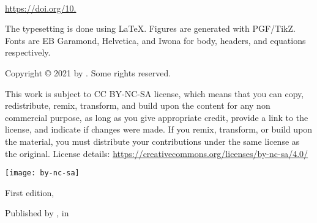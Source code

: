 
{\small\setlength{\parindent}{0em}\setlength{\parskip}{1em}
~

\vfill

\url{https://doi.org/10.}

The typesetting is done using \LaTeX. Figures are generated with PGF/TikZ. Fonts are EB Garamond, Helvetica, and Iwona for body, headers, and equations respectively.

Copyright \copyright{} 2021 by \authorname. Some rights reserved.

This work is subject to CC BY-NC-SA license, which means that you can copy, redistribute, remix, transform, and build upon the content for any non commercial purpose, as long as you give appropriate credit, provide a link to the license, and indicate if changes were made. If you remix, transform, or build upon the material, you must distribute your contributions under the same license as the original. License details: \url{https://creativecommons.org/licenses/by-nc-sa/4.0/}

\texttt{[image: by-nc-sa]}

First edition, \editionyear{}


Published by \publisher{}, in \place{}
}\cleardoublepage
